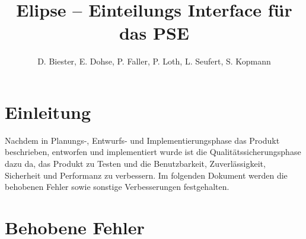 \documentclass[parskip=full]{scrartcl}
\begin{document}
\title{Elipse -- Einteilungs Interface für das PSE}
\author{D. Biester, E. Dohse, P. Faller, P. Loth, L. Seufert, S. Kopmann}
\zweitgutachter{}
\mytitlepage
{\setlength{\textheight}{297mm}
\tableofcontents

\setlength{\textheight}{297mm}}
\pagebreak

\section{Einleitung}
Nachdem in Planungs-, Entwurfs- und Implementierungsphase das Produkt
beschrieben, entworfen und implementiert wurde ist die Qualitätssicherungsphase
dazu da, das Produkt zu Testen und die Benutzbarkeit, Zuverlässigkeit, 
Sicherheit und Performanz zu verbessern. Im folgenden Dokument werden die
behobenen Fehler sowie sonstige Verbesserungen festgehalten.

\section{Behobene Fehler}
\end{document}
